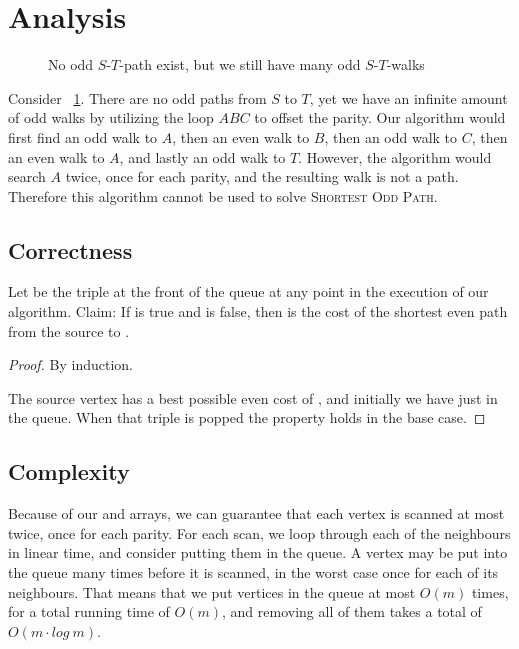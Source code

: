 \section{Analysis}

\begin{figure}
    \centering
    
    \caption{No odd $S$-$T$-path exist, but we still have many odd $S$-$T$-walks}
    \label{small2}
\end{figure}

Consider ~\ref{small2}. There are no odd paths from $S$ to $T$, yet we have an infinite amount of odd walks by utilizing the loop $ABC$ to offset the parity. Our algorithm would first find an odd walk to $A$, then an even walk to $B$, then an odd walk to $C$, then an even walk to $A$, and lastly an odd walk to $T$. However, the algorithm would search $A$ twice, once for each parity, and the resulting walk is not a path. Therefore this algorithm cannot be used to solve \textsc{Shortest Odd Path}.

\subsection{Correctness}
Let  be the triple at the front of the queue at any point in the execution of our algorithm.
Claim: If  is true and  is false, then  is the cost of the shortest even path from the source to .

\begin{proof}
By induction. 

The source vertex  has a best possible even cost of , and initially we have just  in the queue. When that triple is popped the property holds in the base case.


\end{proof}


\subsection{Complexity}
Because of our  and  arrays, we can guarantee that each vertex is scanned at most twice, once for each parity. 
For each scan, we loop through each of the neighbours in linear time, and consider putting them in the queue. A vertex may be put into the queue many times before it is scanned, in the worst case once for each of its neighbours. That means that we put vertices in the queue at most $O(m)$ times, for a total running time of $O(m)$, and removing all of them takes a total of $O(m \cdot log ~ m)$. 

